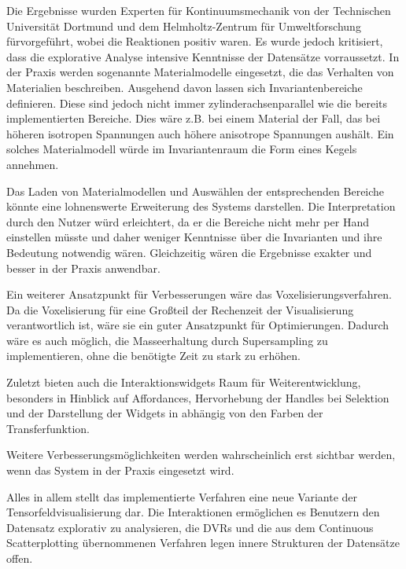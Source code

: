 \documentclass[a4paper,fontsize=12pt,toc=bib,halfparskip]{scrartcl}
\begin{document}
Die Ergebnisse wurden Experten f\"ur Kontinuumsmechanik von der Technischen Universit\"at Dortmund und dem Helmholtz-Zentrum f\"ur Umweltforschung f\"urvorgef\"uhrt, wobei die Reaktionen positiv waren. Es wurde jedoch kritisiert, dass die explorative Analyse intensive Kenntnisse der Datens\"atze vorraussetzt. In der Praxis werden sogenannte Materialmodelle eingesetzt, die das Verhalten von Materialien beschreiben. Ausgehend davon lassen sich Invariantenbereiche definieren. Diese sind jedoch nicht immer zylinderachsenparallel wie die bereits implementierten Bereiche. Dies w\"are z.B. bei einem Material der Fall, das bei h\"oheren isotropen Spannungen auch h\"ohere anisotrope Spannungen aush\"alt. Ein solches Materialmodell w\"urde im Invariantenraum die Form eines Kegels annehmen. 

Das Laden von Materialmodellen und Ausw\"ahlen der entsprechenden Bereiche k\"onnte eine lohnenswerte Erweiterung des Systems darstellen. Die Interpretation durch den Nutzer w\"urd erleichtert, da er die Bereiche nicht mehr per Hand einstellen m\"usste und daher weniger Kenntnisse \"uber die Invarianten und ihre Bedeutung notwendig w\"aren. Gleichzeitig w\"aren die Ergebnisse exakter und besser in der Praxis anwendbar. 

Ein weiterer Ansatzpunkt f\"ur Verbesserungen w\"are das Voxelisierungsverfahren. Da die Voxelisierung f\"ur eine Gro{\ss}teil der Rechenzeit der Visualisierung verantwortlich ist, w\"are sie ein guter Ansatzpunkt f\"ur Optimierungen. Dadurch w\"are es auch m\"oglich, die Masseerhaltung durch Supersampling zu implementieren, ohne die ben\"otigte Zeit zu stark zu erh\"ohen.

Zuletzt bieten auch die Interaktionswidgets Raum f\"ur Weiterentwicklung, besonders in Hinblick auf Affordances, Hervorhebung der Handles bei Selektion und der Darstellung der Widgets in abh\"angig von den Farben der Transferfunktion.
 
Weitere Verbesserungsm\"oglichkeiten werden wahrscheinlich erst sichtbar werden, wenn das System in der Praxis eingesetzt wird. 

Alles in allem stellt das implementierte Verfahren eine neue Variante der Tensorfeldvisualisierung dar. Die Interaktionen erm\"oglichen es Benutzern den Datensatz explorativ zu analysieren, die DVRs und die aus dem Continuous Scatterplotting \"ubernommenen Verfahren legen innere Strukturen der Datens\"atze offen.


\label{LastPageBeforeRefs}
\clearpage
{}

\printbibliography
\label{LastBibPage}
\end{document}

